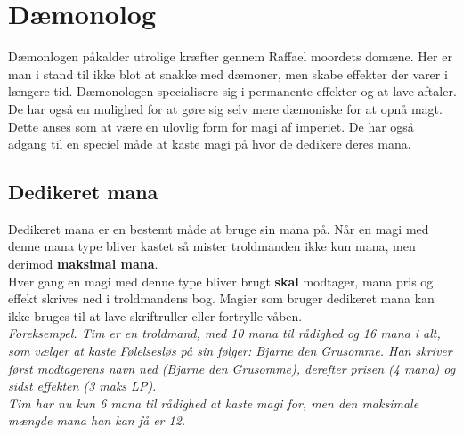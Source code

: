 \chapter*{Dæmonolog}
Dæmonlogen påkalder utrolige kræfter gennem Raffael moordets domæne. Her er man i stand til ikke blot at snakke med dæmoner, men skabe effekter der varer i længere tid. Dæmonologen specialisere sig i permanente effekter og at lave aftaler. De har også en mulighed for at gøre sig selv mere dæmoniske for at opnå magt. Dette anses som at være en ulovlig form for magi af imperiet. De har også adgang til en speciel måde at kaste magi på hvor de dedikere deres mana.

\section*{Dedikeret mana}
Dedikeret mana er en bestemt måde at bruge sin mana på. Når en magi med denne mana type bliver kastet så mister troldmanden ikke kun mana, men derimod \textbf{maksimal mana}.\\ Hver gang en magi med denne type bliver brugt \textbf{skal} modtager, mana pris og effekt skrives ned i troldmandens bog. Magier som bruger dedikeret mana kan ikke bruges til at lave skriftruller eller fortrylle våben.\\

\textit{Foreksempel. Tim er en troldmand, med 10 mana til rådighed og 16 mana i alt, som vælger at kaste Følelsesløs på sin følger: Bjarne den Grusomme. Han skriver først modtagerens navn ned (Bjarne den Grusomme), derefter prisen (4 mana) og sidst effekten (3 maks LP).\\
Tim har nu kun 6 mana til rådighed at kaste magi for, men den maksimale mængde mana han kan få er 12.}\\

